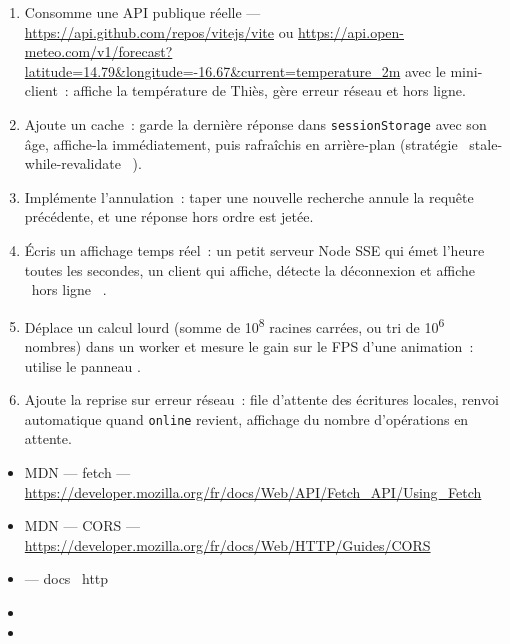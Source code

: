 \begin{exercice}
\begin{enumerate}
  \item Consomme une API publique r\'eelle --- \url{https://api.github.com/repos/vitejs/vite} ou
        \url{https://api.open-meteo.com/v1/forecast?latitude=14.79&longitude=-16.67&current=temperature_2m}
        avec le mini-client~: affiche la temp\'erature de Thi\`es, g\`ere erreur r\'eseau et hors ligne.
  \item Ajoute un cache~: garde la derni\`ere r\'eponse dans \verb|sessionStorage| avec son \^age,
        affiche-la imm\'ediatement, puis rafra\^ichis en arri\`ere-plan (strat\'egie
        \og ~stale-while-revalidate~ \fg{}).
  \item Impl\'emente l'annulation~: taper une nouvelle recherche annule la requ\^ete pr\'ec\'edente,
        et une r\'eponse hors ordre est jet\'ee.
  \item \'Ecris un affichage temps r\'eel~: un petit serveur Node SSE qui \'emet l'heure toutes les
        secondes, un client qui affiche, d\'etecte la d\'econnexion et affiche \og ~hors ligne~ \fg{}.
  \item D\'eplace un calcul lourd (somme de 10\textsuperscript{8} racines carr\'ees, ou tri de
        10\textsuperscript{6} nombres) dans un worker et mesure le gain sur le FPS d'une
        animation~: utilise le panneau .
  \item Ajoute la reprise sur erreur r\'eseau~: file d'attente des \'ecritures locales, renvoi
        automatique quand \verb|online| revient, affichage du nombre d'op\'erations en attente.
\end{enumerate}
\end{exercice}

\begin{ressources}
\begin{itemize}
  \item MDN --- fetch --- \url{https://developer.mozilla.org/fr/docs/Web/API/Fetch_API/Using_Fetch}
  \item MDN --- CORS --- \url{https://developer.mozilla.org/fr/docs/Web/HTTP/Guides/CORS}
  \item {} --- docs \og ~http~ \fg{}
  \item {}
  \item {}
\end{itemize}
\end{ressources}


